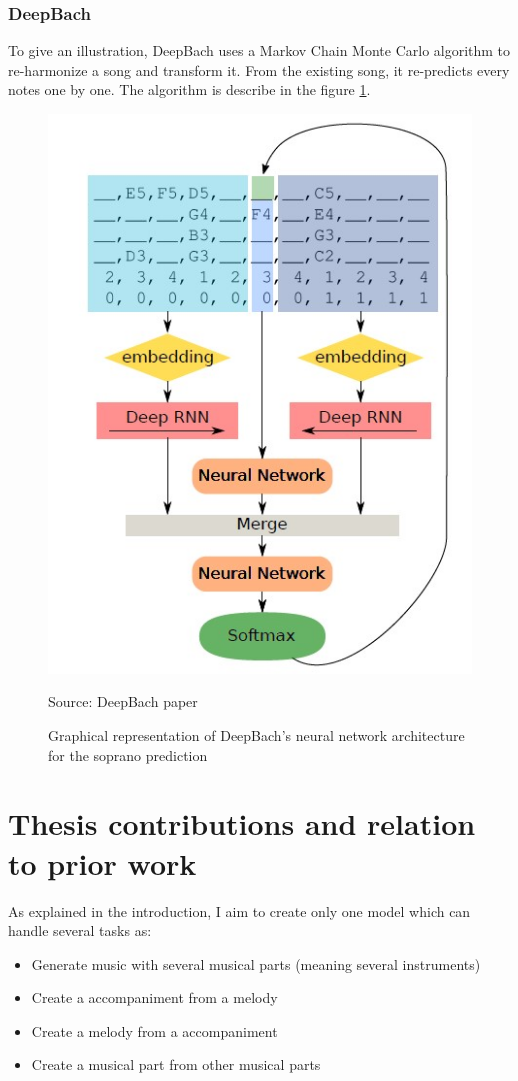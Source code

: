 \documentclass[12pt]{report}
\begin{document}
\subsubsection{DeepBach}

To give an illustration, DeepBach \cite{hadjeres_deepbach:_2016} uses a Markov Chain Monte Carlo algorithm to re-harmonize a song and transform it. 
From the existing song, it re-predicts every notes one by one.
The algorithm is describe in the figure \ref{fig:relatedworks:deepbach_architecture}.

\begin{figure}[htbp]
     \centering
     \includegraphics[width=.5\linewidth]{images/related_works/deepbach/deepbach_algo.jpg}
     \caption{Graphical representation of DeepBach's neural network architecture for the soprano prediction}
     Source: DeepBach paper \cite{hadjeres_deepbach:_2016}
     \label{fig:relatedworks:deepbach_architecture}
\end{figure}

\section{Thesis contributions and relation to prior work}

As explained in the introduction, I aim to create only one model which can handle several tasks as:
\begin{itemize}
    \item Generate music with several musical parts (meaning several instruments)
    \item Create a accompaniment from a melody
    \item Create a melody from a accompaniment
    \item Create a musical part from other musical parts
\end{itemize}
\end{document}

